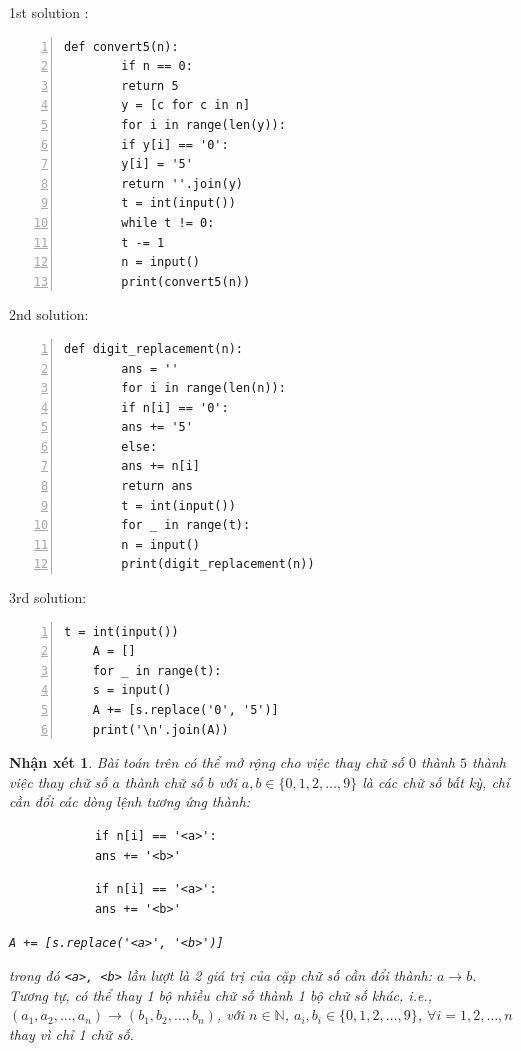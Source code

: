 \documentclass{article}
\newtheorem{nhanxet}{Nhận xét}
\begin{document}
\begin{multicols}{2}
	1st solution \cite[1., p. 202]{Duc_200_BT_Python}:
	\begin{Verbatim}[numbers=left,xleftmargin=5mm]
		def convert5(n):
		if n == 0:
		return 5
		y = [c for c in n]
		for i in range(len(y)):
		if y[i] == '0':
		y[i] = '5'
		return ''.join(y)
		t = int(input())
		while t != 0:
		t -= 1
		n = input()
		print(convert5(n))
	\end{Verbatim}
	\columnbreak
	2nd solution:
	\begin{Verbatim}[numbers=left,xleftmargin=5mm]
		def digit_replacement(n):
		ans = ''
		for i in range(len(n)):
		if n[i] == '0':
		ans += '5'
		else:
		ans += n[i]
		return ans
		t = int(input())
		for _ in range(t):
		n = input()
		print(digit_replacement(n))
	\end{Verbatim}
\end{multicols}
3rd solution:
\begin{Verbatim}[numbers=left,xleftmargin=5mm]
	t = int(input())
	A = []
	for _ in range(t):
	s = input()
	A += [s.replace('0', '5')]
	print('\n'.join(A))
\end{Verbatim}

\begin{nhanxet}
	Bài toán trên có thể mở rộng cho việc thay chữ số $0$ thành $5$ thành việc thay chữ số $a$ thành chữ số $b$ với $a,b\in\{0,1,2,\ldots,9\}$ là các chữ số bất kỳ, chỉ cần đổi các dòng lệnh tương ứng thành:
	\begin{multicols}{3}
		\begin{verbatim}
			if n[i] == '<a>':
			ans += '<b>'
		\end{verbatim}
		\begin{verbatim}
			if n[i] == '<a>':
			ans += '<b>'
		\end{verbatim}
		\verb|A += [s.replace('<a>', '<b>')]|
	\end{multicols}
	\noindent trong đó \verb|<a>, <b>| lần lượt là 2 giá trị của cặp chữ số cần đổi thành: $a\to b$. Tương tự, có thể thay 1 bộ nhiều chữ số thành 1 bộ chữ số khác, i.e., $(a_1,a_2,\ldots,a_n)\to(b_1,b_2,\ldots,b_n)$, với $n\in\mathbb{N}$, $a_i,b_i\in\{0,1,2,\ldots,9\}$, $\forall i = 1,2,\ldots,n$ thay vì chỉ 1 chữ số.
\end{nhanxet}
\end{document}
